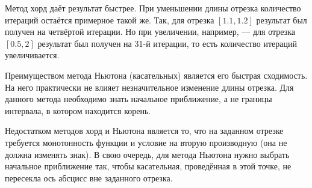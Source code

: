 Метод хорд даёт результат быстрее.
При уменьшении длины отрезка количество итераций остаётся примерное такой же.
Так, для отрезка $ \left[ 1.1, 1.2 \right] $ результат был получен на четвёртой итерации.
Но при увеличении, например, --- для отрезка $ \left[ 0.5, 2 \right] $ результат был получен на 31-й итерации, то есть количество итераций увеличивается.

Преимуществом метода Ньютона (касательных) является его быстрая сходимость.
На него практически не влияет незначительное изменение длины отрезка.
Для данного метода необходимо знать начальное приближение, а не границы интервала, в котором находится корень.

Недостатком методов хорд и Ньютона является то, что на заданном отрезке требуется монотонность функции и условие на вторую производную (она не должна изменять знак).
В свою очередь, для метода Ньютона нужно выбрать начальное приближение так, чтобы касательная, проведённая в этой точке, не пересекла ось абсцисс вне заданного отрезка.


